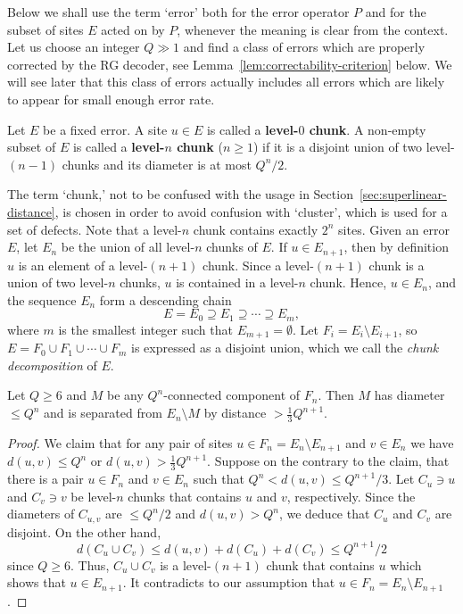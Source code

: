 Below we shall use the term `error' 
both for the error operator $P$ and for the subset of sites $E$ acted on by $P$, 
whenever the meaning is clear from the context.
Let us choose an integer $Q \gg 1$ and find a class of errors which are properly corrected by the RG decoder,
see Lemma~\ref{lem:correctability-criterion} below.
We will see later that this class of errors actually includes all errors which are likely to appear for small enough error rate.
\begin{defn}
Let $E$ be a fixed error.
A site $u\in E$ is called a {\bf level-$0$ chunk}.
A non-empty subset of $E$ is called a {\bf level-$n$ chunk} ($n\ge 1$) 
if it is a disjoint union of two level-$(n-1)$ chunks and its diameter is at most $Q^n /2$.
\end{defn}
The term `chunk,' not to be confused with the usage in Section~\ref{sec:superlinear-distance},
is chosen in order to avoid confusion with `cluster', which is used for a set of defects.
Note that a level-$n$ chunk contains exactly  $2^n$ sites.
Given an error $E$, let $E_n$ be the union of all level-$n$ chunks of $E$.
If $u \in E_{n+1}$, then by definition $u$ is an element of a level-$(n+1)$ chunk.
Since a level-$(n+1)$ chunk is a union of two level-$n$ chunks, $u$ is contained in a level-$n$ chunk. Hence, $u \in E_n$, and the sequence $E_n$ form a descending chain
\[
 E = E_0 \supseteq E_1 \supseteq \cdots \supseteq E_m ,
\]
where $m$ is the smallest integer such that $E_{m+1}=\emptyset$.
Let $F_i = E_i \setminus E_{i+1}$, so $E = F_0 \cup F_1 \cup \cdots \cup F_m$ is expressed as a disjoint union, which we call the \emph{chunk decomposition} of $E$.
\begin{prop}
Let $Q \ge 6$ and $M$ be any $Q^n$-connected component of $F_n$. Then
$M$ has diameter $\le Q^n$ and is separated from $E_n \setminus M$ by distance $> \frac{1}{3}Q^{n+1}$.
\label{prop:structure-Fn}
\end{prop}
\begin{proof}
We claim that for any pair of sites $u \in F_n = E_n \setminus E_{n+1}$ and $v \in E_n$ we have $ d( u,v) \le Q^n$ or $d( u,v ) > \frac{1}{3} Q^{n+1}$.
Suppose on the contrary to the claim, that there is a pair $u \in F_n$ and $v \in E_n$ such that $ Q^n < d(u,v) \le Q^{n+1} /3$. Let $C_u \ni u$ and $C_v \ni v$ be level-$n$ chunks that contains $u$ and $v$, respectively. Since the diameters of $C_{u,v}$ are $\le Q^n /2$ and $d(u,v) > Q^n$, we deduce that $C_u$ and $C_v$ are disjoint. On the other hand,
\[
 d( C_u \cup C_v ) \le d( u,v ) + d(C_u) + d(C_v)  \le Q^{n+1}/2
\]
since $Q \ge 6$. Thus, $C_u \cup C_v$ is a level-$(n+1)$ chunk that contains $u$
which shows that $u \in E_{n+1}$. It contradicts to our assumption that $u\in F_n=E_n \setminus E_{n+1}$.
\end{proof}
